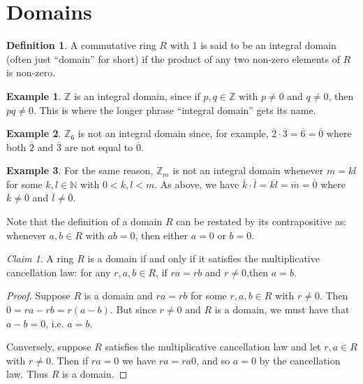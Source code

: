 \documentclass[12pt,letterpaper,DIV=11,final]{scrartcl}
\theoremstyle{plain}
\theoremstyle{definition}
\newtheorem{definition}{Definition}[section]
\newtheorem{example}{Example}[section]
\theoremstyle{remark}
\newtheorem{claim}{Claim}
\begin{document}
\section{Domains}
\begin{definition}
  A commutative ring $R$ with 1 is said to be an integral domain (often just \enquote{domain} for short) if the product of any two non-zero elements of $R$ is non-zero.
\end{definition}

\begin{example}
  $\mathbb{Z}$ is an integral domain, since if $p, q \in \mathbb{Z}$ with $p \neq 0$ and $q \neq 0$, then $pq \neq 0$.
  This is where the longer phrase \enquote{integral domain} gets its name.
\end{example}

\begin{example}
  $\mathbb{Z}_6$ is not an integral domain since, for example, $\overline{2} \cdot \overline{3} = \overline{6} = \overline{0}$ where both $\overline{2}$ and $\overline{3}$ are not equal to $\overline{0}$.
\end{example}

\begin{example}\label{ex:zm_composite}
  For the same reason, $\mathbb{Z}_m$ is not an integral domain whenever $m = kl$ for some $k, l \in \mathbb{N}$ with $0 < k, l < m$.
  As above, we have $\overline{k} \cdot \overline{l} = \overline{kl} = \overline{m} = \overline{0}$ where $\overline{k} \neq \overline{0}$ and $\overline{l} \neq \overline{0}$.
\end{example}

Note that the definition of a domain $R$ can be restated by its contrapositive as: whenever $a, b \in R$ with $ab = 0$, then either $a = 0$ or $b = 0$.

\begin{claim}
  A ring $R$ is a domain if and only if it satisfies the multiplicative cancellation law: for any $r, a, b \in R$, if $ra = rb$ and $r \neq 0$,then $a = b$.

  \begin{proof}
    Suppose $R$ is a domain and $ra = rb$ for some $r, a, b \in R$ with $r \neq 0$.
    Then $0 = ra - rb = r(a - b)$.
    But since $r \neq 0$ and $R$ is a domain, we must have that $a - b = 0$, i.e. $a = b$.

    Conversely, suppose $R$ satisfies the multiplicative cancellation law and let $r, a \in R$ with $r \neq 0$.
    Then if $ra = 0$ we have $ra = ra0$, and so $a = 0$ by the cancellation law.
    Thus $R$ is a domain.
  \end{proof}
\end{claim}
\end{document}
